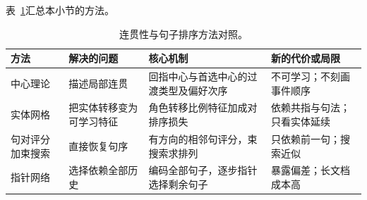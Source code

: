 表~\ref{tab:nlp-analysis-coherence-methods}汇总本小节的方法。

\begin{table}[htbp]
  \centering
  \small
  \begin{tabularx}{\linewidth}{@{}l XXX@{}}
    \toprule
    方法 & 解决的问题 & 核心机制 & 新的代价或局限\\
    \midrule
    中心理论 & 描述局部连贯 & 回指中心与首选中心的过渡类型及偏好次序 & 不可学习；不刻画事件顺序\\
    实体网格 & 把实体转移变为可学习特征 & 角色转移比例特征加成对排序损失 & 依赖共指与句法；只看实体延续\\
    句对评分加束搜索 & 直接恢复句序 & 有方向的相邻句评分，束搜索求排列 & 只依赖前一句；搜索近似\\
    指针网络 & 选择依赖全部历史 & 编码全部句子，逐步指针选择剩余句子 & 暴露偏差；长文档成本高\\
    \bottomrule
  \end{tabularx}
  \caption{连贯性与句子排序方法对照。}
  \label{tab:nlp-analysis-coherence-methods}
\end{table}
